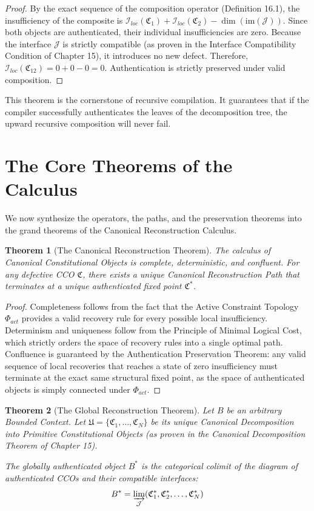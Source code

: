 \documentclass[12pt,openany]{extbook}
\theoremstyle{plain}
\newtheorem{theorem}{Theorem}[chapter]
\theoremstyle{definition}
\begin{document}
\begin{proof}
By the exact sequence of the composition operator (Definition 16.1), the insufficiency of the composite is $\mathcal{I}_{loc}(\mathfrak{C}_1) + \mathcal{I}_{loc}(\mathfrak{C}_2) - \dim(\text{im}(\mathcal{J}))$. Since both objects are authenticated, their individual insufficiencies are zero. Because the interface $\mathcal{J}$ is strictly compatible (as proven in the Interface Compatibility Condition of Chapter 15), it introduces no new defect. Therefore, $\mathcal{I}_{loc}(\mathfrak{C}_{12}) = 0 + 0 - 0 = 0$. Authentication is strictly preserved under valid composition.
\end{proof}

This theorem is the cornerstone of recursive compilation. It guarantees that if the compiler successfully authenticates the leaves of the decomposition tree, the upward recursive composition will never fail.

\section{The Core Theorems of the Calculus}

We now synthesize the operators, the paths, and the preservation theorems into the grand theorems of the Canonical Reconstruction Calculus.

\begin{theorem}[The Canonical Reconstruction Theorem]
The calculus of Canonical Constitutional Objects is complete, deterministic, and confluent. For any defective CCO $\mathfrak{C}$, there exists a unique Canonical Reconstruction Path that terminates at a unique authenticated fixed point $\mathfrak{C}^*$. 
\end{theorem}

\begin{proof}
Completeness follows from the fact that the Active Constraint Topology $\Phi_{act}$ provides a valid recovery rule for every possible local insufficiency. Determinism and uniqueness follow from the Principle of Minimal Logical Cost, which strictly orders the space of recovery rules into a single optimal path. Confluence is guaranteed by the Authentication Preservation Theorem: any valid sequence of local recoveries that reaches a state of zero insufficiency must terminate at the exact same structural fixed point, as the space of authenticated objects is simply connected under $\Phi_{act}$.
\end{proof}

\begin{theorem}[The Global Reconstruction Theorem]
Let $B$ be an arbitrary Bounded Context. Let $\mathfrak{U} = \{\mathfrak{C}_1, \dots, \mathfrak{C}_N\}$ be its unique Canonical Decomposition into Primitive Constitutional Objects (as proven in the Canonical Decomposition Theorem of Chapter 15). 

The globally authenticated object $B^*$ is the categorical colimit of the diagram of authenticated CCOs and their compatible interfaces:
\[
B^* = \varinjlim_{\mathcal{J}} (\mathfrak{C}_1^*, \mathfrak{C}_2^*, \dots, \mathfrak{C}_N^*)
\]
\end{theorem}
\end{document}
